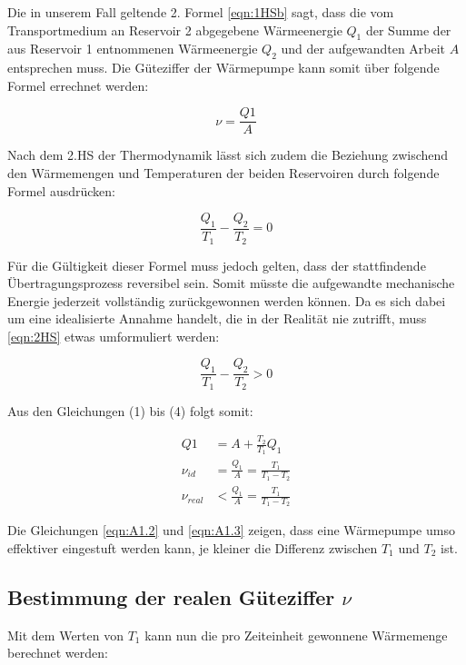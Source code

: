 Die in unserem Fall geltende 2. Formel \eqref{eqn:1HSb} sagt, dass die vom Transportmedium an Reservoir 2 abgegebene
Wärmeenergie $Q_1$ der Summe der aus Reservoir 1 entnommenen Wärmeenergie $Q_2$ und der aufgewandten Arbeit $A$
entsprechen muss. Die Güteziffer der Wärmepumpe kann somit über folgende Formel errechnet werden:

\begin{equation}
  \nu = \frac{Q1}{A}
\end{equation}

Nach dem 2.HS der Thermodynamik lässt sich zudem die Beziehung zwischend den Wärmemengen und Temperaturen der
beiden Reservoiren durch folgende Formel ausdrücken:

\begin{equation}
  \label{eqn:2HS}
  \frac{Q_1}{T_1} - \frac{Q_2}{T_2} = 0
\end{equation}

Für die Gültigkeit dieser Formel muss jedoch gelten, dass der stattfindende Übertragungsprozess reversibel sein.
Somit müsste die aufgewandte mechanische Energie jederzeit vollständig zurückgewonnen werden können. Da es
sich dabei um eine idealisierte Annahme handelt, die in der Realität nie zutrifft, muss \eqref{eqn:2HS} etwas
umformuliert werden:

\begin{equation}
  \label{eqn:2HS1}
  \frac{Q_1}{T_1} - \frac{Q_2}{T_2} > 0
\end{equation}

Aus den Gleichungen (1) bis (4) folgt somit:

\begin{align}
  Q1         &= A + \frac{T_2}{T_1}Q_1 \label{eqn:A1.1} \\
  \nu_{id}   &= \frac{Q_1}{A} = \frac{T_1}{T_1 - T_2} \label{eqn:A1.2} \\
  \nu_{real} &< \frac{Q_1}{A} = \frac{T_1}{T_1 - T_2} \label{eqn:A1.3}
\end{align}

Die Gleichungen \eqref{eqn:A1.2} und \eqref{eqn:A1.3} zeigen, dass eine Wärmepumpe umso effektiver eingestuft werden
kann, je kleiner die Differenz zwischen $T_1$ und $T_2$ ist.

\subsection{Bestimmung der realen Güteziffer \texorpdfstring{$\nu$}{z}}

Mit dem Werten von $T_1$ kann nun die pro Zeiteinheit gewonnene Wärmemenge berechnet werden:

